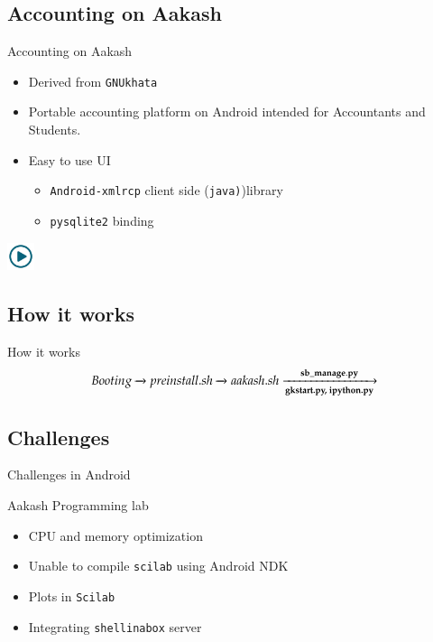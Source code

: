 \documentclass{beamer}
\begin{document}
  \subsection{Accounting on Aakash}
  \begin{frame}{Accounting on Aakash}
    \begin{itemize}
      \item Derived from {\tt GNUkhata}
      \item Portable accounting platform on Android intended for
        Accountants and Students.
      \item Easy to use UI
        \pause
        \begin{itemize}
          \item {\tt Android-xmlrcp} client side ({\tt java)})library
          \item {\tt pysqlite2} binding
        \end{itemize}
    \end{itemize}
      \centerline{\href{file:///home/sachin/github/slides/scipy2012/account.3gp}{\includegraphics[height=0.8cm,width=0.8cm]{play.jpg}}}
  \end{frame}

  \subsection{How it works}
  \begin{frame}{How it works}
    \begin{equation*}
      Booting \xrightarrow[\text{}]{} 
      preinstall.sh \xrightarrow[\text{}]{}
      aakash.sh\xrightarrow[\text{\bf{gkstart.py, ipython.py}}]{\bf{sb\_manage.py}}
    \end{equation*}
  \end{frame}

  \subsection{Challenges}
  \begin{frame}{Challenges in Android}
    \begin{block}{Aakash Programming lab}
      \begin{itemize}
        \item CPU and memory optimization
        \item Unable to compile {\tt scilab} using Android NDK
        \item Plots in {\tt Scilab}
        \item Integrating {\tt shellinabox} server
      \end{itemize}
    \end{block}
    \end{frame}
\end{document}
